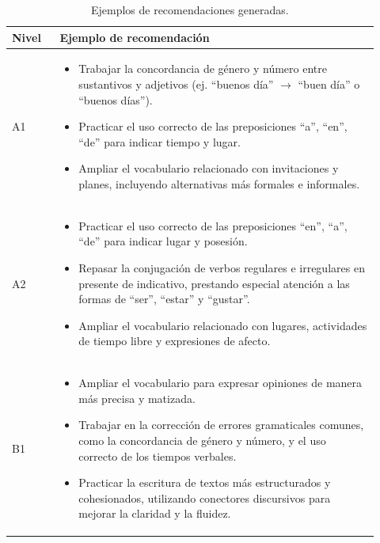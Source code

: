 \documentclass[spanish]{textolivre}
\begin{document}
\begin{table}[h!]
    \caption{Ejemplos de recomendaciones generadas.}
    \label{tab4}
    \centering
    \renewcommand{\arraystretch}{1.2}
    \begin{tabular}{>{\raggedright\arraybackslash}p{0.12\linewidth}>{\raggedright\arraybackslash}p{0.80\linewidth}}
        \toprule
        Nivel & Ejemplo de recomendación \\
        \midrule
        A1 &
        \begin{itemize}
            \item Trabajar la concordancia de género y número entre sustantivos y adjetivos (ej. ``buenos día'' $\rightarrow$ ``buen día'' o ``buenos días'').
            \item Practicar el uso correcto de las preposiciones ``a'', ``en'', ``de'' para indicar tiempo y lugar.
            \item Ampliar el vocabulario relacionado con invitaciones y planes, incluyendo alternativas más formales e informales.
        \end{itemize}
        \\
        A2 &
        \begin{itemize}
            \item Practicar el uso correcto de las preposiciones ``en'', ``a'', ``de'' para indicar lugar y posesión.
            \item Repasar la conjugación de verbos regulares e irregulares en presente de indicativo, prestando especial atención a las formas de ``ser'', ``estar'' y ``gustar''.
            \item Ampliar el vocabulario relacionado con lugares, actividades de tiempo libre y expresiones de afecto.
        \end{itemize}
        \\
        B1 &
        \begin{itemize}
            \item Ampliar el vocabulario para expresar opiniones de manera más precisa y matizada.
            \item Trabajar en la corrección de errores gramaticales comunes, como la concordancia de género y número, y el uso correcto de los tiempos verbales.
            \item Practicar la escritura de textos más estructurados y cohesionados, utilizando conectores discursivos para mejorar la claridad y la fluidez.
        \end{itemize}
        \\

\end{tabular}
\end{table}
\end{document}
